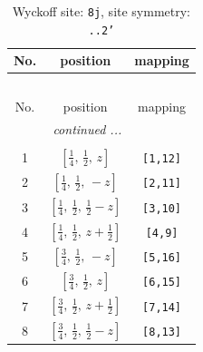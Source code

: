 \documentclass[fleqn,8pt]{jsarticle}
\begin{document}
\begin{longtable}{ccc}
\caption{Wyckoff site: {\tt 8j}, site symmetry: {\tt ..2'}}
 \\
 \hline \hline
No. & position & mapping \\ \hline \endfirsthead

\multicolumn{2}{l}{\tablename\ \thetable{}} \\
 \hline \hline
No. & position & mapping \\ \hline \endhead

 \hline \hline
\multicolumn{2}{r}{\footnotesize\it continued ...} \\ \endfoot

 \hline \hline
\multicolumn{2}{r}{} \\ \endlastfoot

1 & $\left[ \frac{1}{4},\, \frac{1}{2},\, z \right]$ & {\tt [1,12]} \\ \hline
2 & $\left[ \frac{1}{4},\, \frac{1}{2},\, - z \right]$ & {\tt [2,11]} \\ \hline
3 & $\left[ \frac{1}{4},\, \frac{1}{2},\, \frac{1}{2} - z \right]$ & {\tt [3,10]} \\ \hline
4 & $\left[ \frac{1}{4},\, \frac{1}{2},\, z + \frac{1}{2} \right]$ & {\tt [4,9]} \\ \hline
5 & $\left[ \frac{3}{4},\, \frac{1}{2},\, - z \right]$ & {\tt [5,16]} \\ \hline
6 & $\left[ \frac{3}{4},\, \frac{1}{2},\, z \right]$ & {\tt [6,15]} \\ \hline
7 & $\left[ \frac{3}{4},\, \frac{1}{2},\, z + \frac{1}{2} \right]$ & {\tt [7,14]} \\ \hline
8 & $\left[ \frac{3}{4},\, \frac{1}{2},\, \frac{1}{2} - z \right]$ & {\tt [8,13]} \\
\end{longtable}
\renewcommand{\arraystretch}{1.2}
\end{document}
